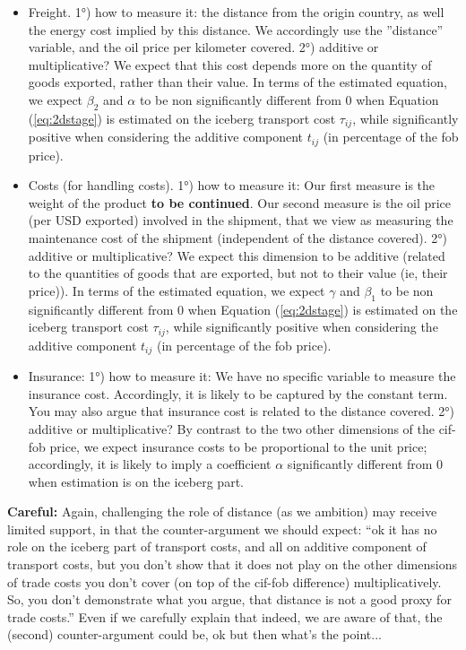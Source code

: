 \documentclass[a4paper,11pt]{article}
\begin{document}
\begin{itemize}

\item Freight. 1°) how to measure it: the distance from the origin country, as well the energy cost implied by this distance. We accordingly use the ''distance'' variable, and the oil price per kilometer covered. 2°) additive or multiplicative? We expect that this cost depends more on the quantity of goods exported, rather than their value. In terms of the estimated equation, we expect $\beta_2$ and $\alpha$ to be non significantly different from 0 when Equation (\ref{eq:2dstage}) is estimated on the iceberg transport cost $\tau_{ij}$, while significantly positive when considering the additive component $t_{ij}$ (in percentage of the fob price).
\item Costs (for handling costs). 1°) how to measure it: Our first measure is the weight of the product \textbf{to be continued}. Our second measure is the oil price (per USD exported) involved in the shipment, that we view as measuring the maintenance cost of the shipment (independent of the distance covered). 2°) additive or multiplicative? We expect this dimension to be additive (related to the quantities of goods that are exported, but not to their value (ie, their price)). In terms of the estimated equation, we expect $\gamma$ and $\beta_1$ to be non significantly different from 0 when Equation (\ref{eq:2dstage}) is estimated on the iceberg transport cost $\tau_{ij}$, while significantly positive when considering the additive component $t_{ij}$ (in percentage of the fob price).
\item Insurance: 1°) how to measure it: We have no specific variable to measure the insurance cost. Accordingly, it is likely to be captured by the constant term. You may also argue that insurance cost is related to the distance covered. 2°) additive or multiplicative? By contrast to the two other dimensions of the cif-fob price, we expect insurance costs to be proportional to the unit price; accordingly, it is likely to imply a coefficient $\alpha$ significantly different from 0 when estimation is on the iceberg part.

\end{itemize}



\textbf{Careful:} Again, challenging the role of distance (as we ambition) may receive limited support, in that the counter-argument we should expect: ``ok it has no role on the iceberg part of transport costs, and all on additive component of transport costs, but you don't show that it does not play on the other dimensions of trade costs you don't cover (on top of the cif-fob difference) multiplicatively. So, you don't demonstrate what you argue, that distance is not a good proxy for trade costs.'' Even if we carefully explain that indeed, we are aware of that, the (second) counter-argument could be, ok but then what's the point...\bigskip
\end{document}
